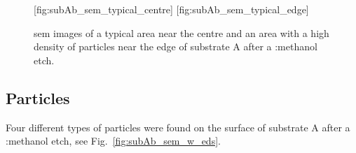 \begin{figure}[htbp]
    [fig:subAb_sem_typical_centre]
    \hfill
    [fig:subAb_sem_typical_edge]
    \caption[\Ac{sem} images of typical areas on substrate A after a :methanol etch.]{\Ac{sem} images of  a typical area near the centre and  an area with a high density of particles near the edge of substrate A after a :methanol etch.}\label{fig:subAb_sem_typical}
\end{figure}

\subsection{Particles}
Four different types of particles were found on the surface of substrate A after a :methanol etch, see Fig.~\ref{fig:subAb_sem_w_eds}.

